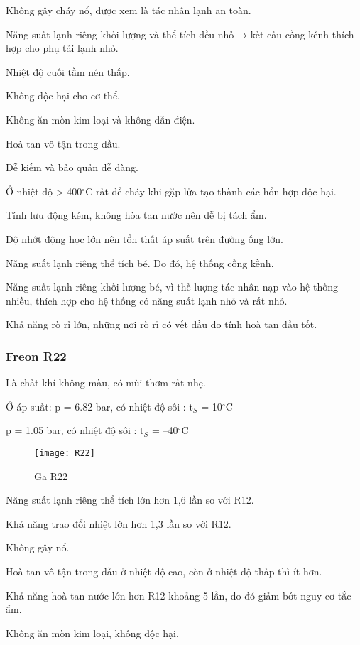 Không gây cháy nổ, được xem là tác nhân lạnh an toàn.

Năng suất lạnh riêng khối lượng và thể tích đều nhỏ → kết cấu cồng kềnh thích hợp cho phụ tải lạnh nhỏ.

Nhiệt độ cuối tầm nén thấp.

Không độc hại cho cơ thể.

Không ăn mòn kim loại và không dẫn điện.

Hoà tan vô tận trong dầu.

Dễ kiếm và bảo quản dễ dàng.

Ở nhiệt độ > 400$^{\circ}$C rất dể cháy khi gặp lửa tạo thành các hổn hợp độc hại.

Tính lưu động kém, không hòa tan nước nên dễ bị tách ẩm.

Độ nhớt động học lớn nên tổn thất áp suất trên đường ống lớn.

Năng suất lạnh riêng thể tích bé. Do đó, hệ thống cồng kềnh.

Năng suất lạnh riêng khối lượng bé, vì thế lượng tác nhân nạp vào hệ thống nhiều, thích hợp cho hệ thống có năng suất lạnh nhỏ và rất nhỏ.

Khả năng rò rỉ lớn, những nơi rò rỉ có vết dầu do tính hoà tan dầu tốt.

\subsubsection{Freon R22}
Là chất khí không màu, có mùi thơm rất nhẹ.

Ở áp suất: 
\hspace{1cm}
p = 6.82 bar, có nhiệt độ sôi : t$_{S}$ = 10$^{\circ}$C

\hspace{2.95cm}
p = 1.05 bar, có nhiệt độ sôi : t$_{S}$ = –40$^{\circ}$C
\begin{figure}[H]
	\centering
	\texttt{[image: R22]}
	\caption{Ga R22}
\end{figure}

Năng suất lạnh riêng thể tích lớn hơn 1,6 lần so với R12.

Khả năng trao đổi nhiệt lớn hơn 1,3 lần so với R12.

Không gây nổ.

Hoà tan vô tận trong dầu ở nhiệt độ cao, còn ở nhiệt độ thấp thì ít hơn.

Khả năng hoà tan nước lớn hơn R12 khoảng 5 lần, do đó giảm bớt nguy cơ tắc ẩm.

Không ăn mòn kim loại, không độc hại.

